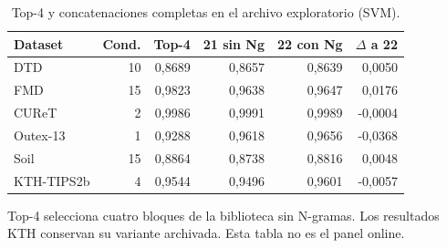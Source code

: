 \begin{table}[!htbp]\centering
\fontsize{9}{11}\selectfont\setlength{\tabcolsep}{4pt}
\caption{Top-4 y concatenaciones completas en el archivo exploratorio (SVM).}\label{tab:tm-top4-svm}
\begin{tabular}{@{}lrrrrr@{}}\toprule
Dataset & Cond. & Top-4 & 21 sin Ng & 22 con Ng & $\Delta$ a 22\\\midrule
DTD & 10 & 0,8689 & 0,8657 & 0,8639 & 0,0050\\
FMD & 15 & 0,9823 & 0,9638 & 0,9647 & 0,0176\\
CUReT & 2 & 0,9986 & 0,9991 & 0,9989 & -0,0004\\
Outex-13 & 1 & 0,9288 & 0,9618 & 0,9656 & -0,0368\\
Soil & 15 & 0,8864 & 0,8738 & 0,8816 & 0,0048\\
KTH-TIPS2b & 4 & 0,9544 & 0,9496 & 0,9601 & -0,0057\\
\bottomrule\end{tabular}
\par\smallskip\begin{minipage}{0.98\textwidth}\footnotesize Top-4 selecciona cuatro bloques de la biblioteca sin N-gramas. Los resultados KTH conservan su variante archivada. Esta tabla no es el panel online.\end{minipage}
\end{table}
